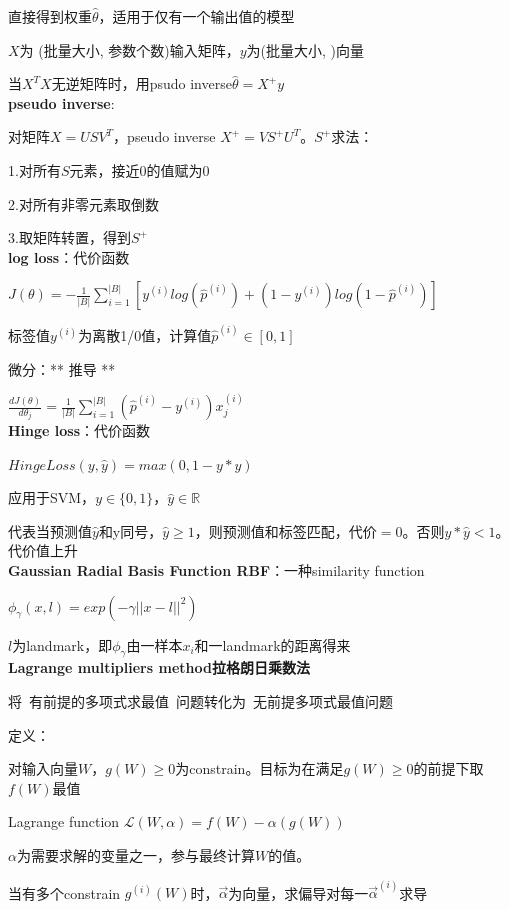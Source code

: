 \documentclass[UTF8]{ctexart}
\begin{document}
  直接得到权重$\hat{\theta}$，适用于仅有一个输出值的模型

  $X$为 (批量大小, 参数个数)输入矩阵，$y$为(批量大小, )向量
  
  当$X^TX$无逆矩阵时，用psudo inverse$\hat{\theta} = X^+y$\\
\textbf{pseudo inverse}:

  对矩阵$X=USV^T$，pseudo inverse $X^+=VS^+U^T$。$S^+$求法：

  \quad 1.对所有$S$元素，接近0的值赋为0

  \quad 2.对所有非零元素取倒数

  \quad 3.取矩阵转置，得到$S^+$\\
\textbf{log loss}：代价函数

  $J(\theta) = -\frac{1}{|B|}\sum_{i=1}^{|B|}[y^{(i)}log(\hat{p}^{(i)}) + (1-y^{(i)})log(1-\hat{p}^{(i)})]$

  标签值$y^{(i)}$为离散1/0值，计算值$\hat{p}^{(i)} \in [0,1]$

  微分：** 推导 **
  
  \quad $\frac{d J(\theta)}{d \theta_j} = \frac{1}{|B|}\sum_{i=1}^{|B|}(\hat{p}^{(i)} - y^{(i)}) x_j^{(i)}$\\
\textbf{Hinge loss}：代价函数

  $HingeLoss(y, \hat{y}) = max(0, 1-y*\hat{y})$

  应用于SVM，$y \in \{0, 1\}$，$\hat{y} \in \mathbb{R} $
  
  代表当预测值$\hat{y}$和y同号，$\hat{y} \geq 1$，则预测值和标签匹配，代价$=0$。否则$y*\hat{y} < 1$。代价值上升\\
\textbf{Gaussian Radial Basis Function RBF}：一种similarity function

  $\phi_{\gamma}(x, l) = exp(-\gamma||x-l||^2)$

  \quad $l$为landmark，即$\phi_{\gamma}$由一样本$x_i$和一landmark的距离得来\\
\textbf{Lagrange multipliers method拉格朗日乘数法}

  将\ 有前提的多项式求最值\ 问题转化为\ 无前提多项式最值问题

  定义：

  \quad 对输入向量$W$，$g(W) \geq 0$为constrain。目标为在满足$g(W) \geq 0$的前提下取$f(W)$最值

  \quad Lagrange function $\mathcal{L} (W, \alpha) = f(W) - \alpha(g(W))$

  \quad \quad $\alpha$为需要求解的变量之一，参与最终计算$W$的值。

  \quad \quad 当有多个constrain $g^{(i)}(W)$时，$\vec{\alpha}$为向量，求偏导对每一$\vec{\alpha}^{(i)}$求导
\end{document}

